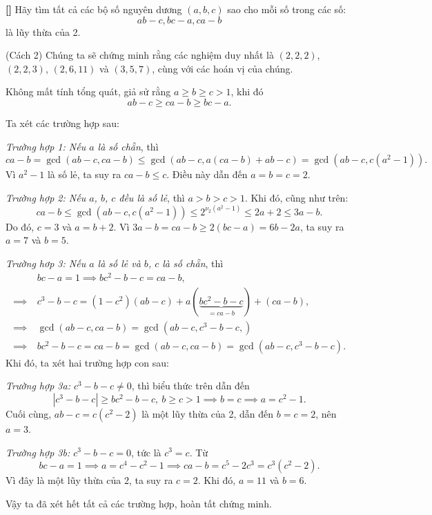 \documentclass[../06-largest-exponent.tex]{subfiles}
\begin{document}
\begin{example*}\textbf{[]}
	Hãy tìm tất cả các bộ số nguyên dương $(a, b, c)$ sao cho mỗi số trong các số:
	\[
		ab - c, bc - a, ca - b
	\]
	là lũy thừa của 2.
\end{example*}

\begin{soln}\footnotemark(Cách 2)
	Chúng ta sẽ chứng minh rằng các nghiệm duy nhất là \( (2,2,2) \), \( (2,2,3) \), \( (2,6,11) \) và \( (3,5,7) \), cùng với các hoán vị của chúng.

	Không mất tính tổng quát, giả sử rằng \( a \geq b \geq c > 1 \), khi đó
	\[
		ab - c \geq ca - b \geq bc - a.
	\]

	Ta xét các trường hợp sau:

	\textit{Trường hợp 1: Nếu \( a \) là số chẵn}, thì
	\[
		ca-b = \gcd (ab-c, ca-b) \leq \gcd (ab-c, a(ca-b) + ab-c) = \gcd\left( ab-c, c(a^2-1) \right).
	\]
	Vì \( a^2 - 1 \) là số lẻ, ta suy ra \( ca - b \leq c \).
	Điều này dẫn đến \( a = b = c = 2 \).

	\textit{Trường hợp 2: Nếu \( a \), \( b \), \( c \) đều là số lẻ}, thì \( a > b > c > 1 \).
	Khi đó, cũng như trên:
	\[
		ca-b \leq \gcd (ab-c, c(a^2-1)) \leq 2^{\nu_2(a^2-1)} \leq 2a+2 \leq 3a-b.
	\]
	Do đó, \( c = 3 \) và \( a = b+2 \).
	Vì \( 3a - b = ca - b \geq 2(bc-a) = 6b - 2a \), ta suy ra \( a=7 \) và \( b=5 \).

	\textit{Trường hơp 3: Nếu \( a \) là số lẻ và \( b \), \( c \) là số chẵn}, thì
	\[
		\begin{aligned}
			&\ bc - a = 1 \implies bc^2 - b - c = ca - b,\\
			\implies&\ c^3 - b - c = (1 - c^2)(ab - c) + a(\underbrace{bc^2 - b - c}_{= ca-b}) + (ca - b),\\
			\implies&\ \gcd(ab - c, ca - b) = \gcd(ab - c, c^3 - b - c,)\\
			\implies&\ bc^2 - b - c = ca - b = \gcd(ab - c, ca - b) = \gcd(ab - c, c^3 - b - c).
		\end{aligned}
	\]
	Khi đó, ta xét hai trường hợp con sau:

	\textit{Trường hợp 3a: \( c^3 - b - c \neq 0 \)}, thì biểu thức trên dẫn đến 
	\[
		|c^3 - b - c| \geq bc^2 - b - c,\ b \geq c > 1 \implies b = c \implies a = c^2 - 1.
	\]
	Cuối cùng, \( ab - c = c(c^2 - 2) \) là một lũy thừa của 2, dẫn đến \( b = c = 2 \), nên \( a = 3 \).

	\textit{Trường hợp 3b: \( c^3 - b - c = 0 \)}, tức là \( c^3 = c \). Từ
	\[
		bc - a = 1 \implies a = c^4 - c^2 - 1 \implies ca - b = c^5 - 2c^3 = c^3(c^2 - 2).
	\]
	Vì đây là một lũy thừa của 2, ta suy ra \( c = 2 \).
	Khi đó, \( a = 11 \) và \( b = 6 \).

	Vậy ta đã xét hết tất cả các trường hợp, hoàn tất chứng minh.
\end{soln}

\end{document}
